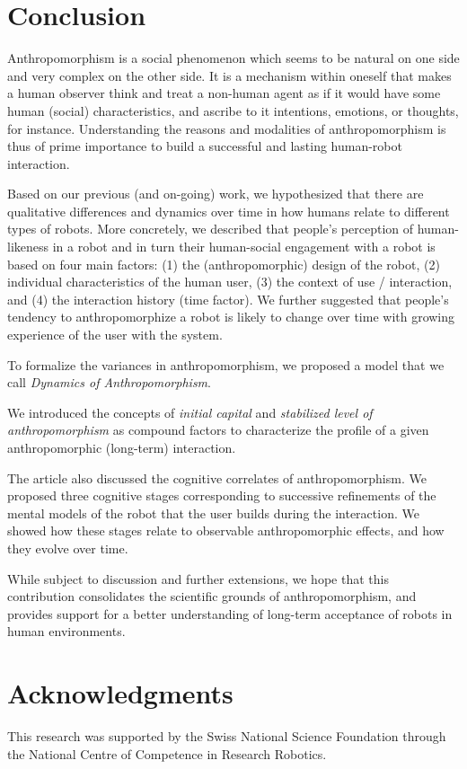 \documentclass{frontiersSCNS} %
\begin{document}
%
%
%
%
%
%

\section{Conclusion}
\label{sec:conclusion}

Anthropomorphism is a social phenomenon which seems to be natural on one side
and very complex on the other side. It is a mechanism within oneself that makes
a human observer think and treat a non-human agent as if it would have some
human (social) characteristics, and ascribe to it intentions, emotions, or
thoughts, for instance. Understanding the reasons and modalities of
anthropomorphism is thus of prime importance to build a successful and lasting
human-robot interaction.

Based on our previous (and on-going) work, we hypothesized that there are
qualitative differences and dynamics over time in how humans relate to different
types of robots. More concretely, we described that people's perception of
human-likeness in a robot and in turn their human-social engagement with a robot
is based on four main factors: (1) the (anthropomorphic) design of the robot,
(2) individual characteristics of the human user, (3) the context of use /
interaction, and (4) the interaction history (time factor). We further suggested
that people's tendency to anthropomorphize a robot is likely to change over time
with growing experience of the user with the system. 

To formalize the variances in anthropomorphism, we proposed a model that we call
\textit{Dynamics of Anthropomorphism}.  

We introduced the concepts of \emph{initial capital} and \emph{stabilized level
of anthropomorphism} as compound factors to characterize the profile of a given
anthropomorphic (long-term) interaction.

The article also discussed the cognitive correlates of anthropomorphism. We
proposed three cognitive stages corresponding to successive refinements of the
mental models of the robot that the user builds during the interaction. We
showed how these stages relate to observable anthropomorphic effects, and how
they evolve over time.

While subject to discussion and further extensions, we hope that this
contribution consolidates the scientific grounds of anthropomorphism, and
provides support for a better understanding of long-term acceptance of robots in
human environments.


\section*{Acknowledgments}

This research was supported by the Swiss National Science Foundation through the
National Centre of Competence in Research Robotics.

\end{document}
